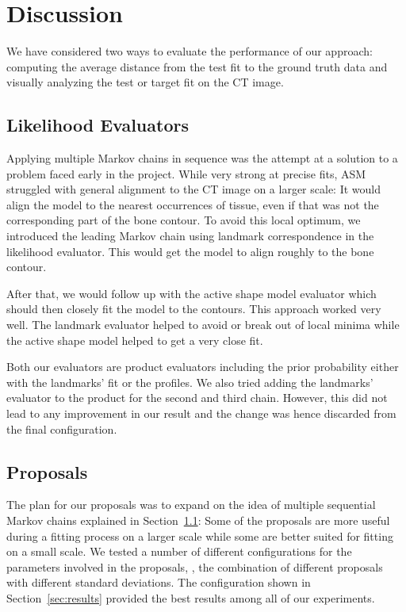 \section{Discussion}
\label{sec:discussion}

We have considered two ways to evaluate the performance of our approach: computing the average distance from the test fit to the ground truth data and visually analyzing the  test or target fit on the CT image. 


\subsection{Likelihood Evaluators}
\label{subsec:evaluators}

Applying multiple Markov chains in sequence was the attempt at a solution to a problem faced early in the project.
While very strong at precise fits, ASM struggled with general alignment to the CT image on a larger scale: It would align the model to the nearest occurrences of tissue, even if that was not the corresponding part of the bone contour.
To avoid this local optimum, we introduced the leading Markov chain using landmark correspondence in the likelihood evaluator.
This would get the model to align roughly to the bone contour. 

After that, we would follow up with the active shape model evaluator which should then closely fit the model to the contours. 
This approach worked very well. 
The landmark evaluator helped to avoid or break out of local minima while the active shape model helped to get a very close fit.

Both our evaluators are product evaluators including the prior probability either with the landmarks' fit or the profiles.
We also tried adding the landmarks' evaluator to the product for the second and third chain.
However, this did not lead to any improvement in our result and the change was hence discarded from the final configuration.


\subsection{Proposals}
\label{subsec:proposals}

The plan for our proposals was to expand on the idea of multiple sequential Markov chains explained in Section~\ref{subsec:evaluators}: Some of the proposals are more useful during a fitting process on a larger scale while some are better suited for fitting on a small scale. 
We tested a number of different configurations for the parameters involved in the proposals, \ie, the combination of different proposals with different standard deviations. 
The configuration shown in Section~\ref{sec:results} provided the best results among all of our experiments. 

